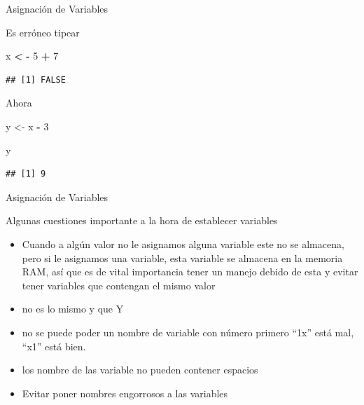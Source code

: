 \documentclass[ignorenonframetext,]{beamer}
\newenvironment{Shaded}{\begin{snugshade}}{\end{snugshade}}
\newcommand{\DecValTok}[1]{\textcolor[rgb]{0.00,0.00,0.81}{#1}}
\newcommand{\StringTok}[1]{\textcolor[rgb]{0.31,0.60,0.02}{#1}}
\newcommand{\OperatorTok}[1]{\textcolor[rgb]{0.81,0.36,0.00}{\textbf{#1}}}
\newcommand{\NormalTok}[1]{#1}
\begin{document}
\begin{frame}[fragile]{Asignación de Variables}

Es erróneo tipear

\begin{Shaded}
\begin{Highlighting}[]
\NormalTok{x }\OperatorTok{<}\StringTok{ }\OperatorTok{-}\StringTok{ }\DecValTok{5} \OperatorTok{+}\StringTok{ }\DecValTok{7}
\end{Highlighting}
\end{Shaded}

\begin{verbatim}
## [1] FALSE
\end{verbatim}

Ahora

\begin{Shaded}
\begin{Highlighting}[]
\NormalTok{y <-}\StringTok{ }\NormalTok{x }\OperatorTok{-}\StringTok{ }\DecValTok{3}
\end{Highlighting}
\end{Shaded}

\begin{Shaded}
\begin{Highlighting}[]
\NormalTok{y}
\end{Highlighting}
\end{Shaded}

\begin{verbatim}
## [1] 9
\end{verbatim}

\end{frame}

\begin{frame}{Asignación de Variables}

Algunas cuestiones importante a la hora de establecer variables

\begin{itemize}
\item
  Cuando a algún valor no le asignamos alguna variable este no se
  almacena, pero si le asignamos una variable, esta variable se almacena
  en la memoria RAM, así que es de vital importancia tener un manejo
  debido de esta y evitar tener variables que contengan el mismo valor
\item
  no es lo mismo y que Y
\item
  no se puede poder un nombre de variable con número primero ``1x'' está
  mal, ``x1'' está bien.
\item
  los nombre de las variable no pueden contener espacios
\item
  Evitar poner nombres engorrosos a las variables
\end{itemize}

\end{frame}
\end{document}
